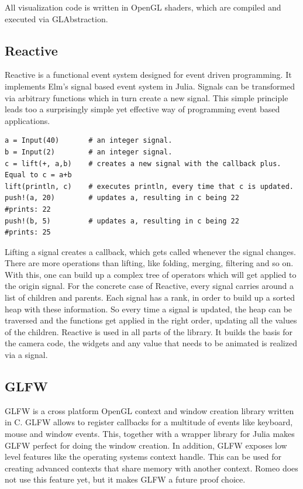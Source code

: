 All visualization code is written in OpenGL shaders, which are compiled and executed via GLAbstraction.

\subsection{Reactive}
Reactive\cite{Reactive} is a functional event system designed for event driven programming.
It implements Elm's\cite{Elm} signal based event system in Julia.
Signals can be transformed via arbitrary functions which in turn create a new signal.
This simple principle leads too a surprisingly simple yet effective way of programming event based applications.

\begin{lstlisting}
a = Input(40)       # an integer signal.
b = Input(2)        # an integer signal.
c = lift(+, a,b)    # creates a new signal with the callback plus. Equal to c = a+b
lift(println, c)    # executes println, every time that c is updated. 
push!(a, 20)        # updates a, resulting in c being 22
#prints: 22
push!(b, 5)         # updates a, resulting in c being 22
#prints: 25
\end{lstlisting}

Lifting a signal creates a callback, which gets called whenever the signal changes.
There are more operations than lifting, like folding, merging, filtering and so on.
With this, one can build up a complex tree of operators which will get applied to the origin signal.
For the concrete case of Reactive, every signal carries around a list of children and parents.
Each signal has a rank, in order to build up a sorted heap with these information.
So every time a signal is updated, the heap can be traversed and the functions get applied in the right order, updating all the values of the children.
Reactive is used in all parts of the library. It builds the basis for the camera code, the widgets and any value that needs to be animated is realized via a signal.

\subsection{GLFW}
GLFW\cite{GLFW} is a cross platform \ac{OpenGL} context and window creation library written in C.
GLFW allows to register callbacks for a multitude of events like keyboard, mouse and window events.
This, together with a wrapper library for Julia makes GLFW perfect for doing the window creation.
In addition, GLFW exposes low level features like the operating systems context handle.
This can be used for creating advanced contexts that share memory with another context.
Romeo does not use this feature yet, but it makes GLFW a future proof choice.


